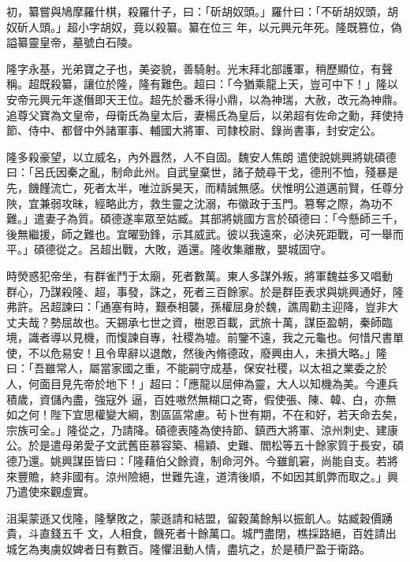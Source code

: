 \begin{pinyinscope}
 初，纂嘗與鳩摩羅什棋，殺羅什子，曰：「斫胡奴頭。」羅什曰：「不斫胡奴頭，胡奴斫人頭。」超小字胡奴，竟以殺纂。纂在位三
 年，以元興元年死。隆既篡位，偽謚纂靈皇帝，墓號白石陵。



 隆字永基，光弟寶之子也，美姿貌，善騎射。光末拜北部護軍，稍歷顯位，有聲稱。超既殺纂，讓位於隆，隆有難色。超曰：「今猶乘龍上天，豈可中下！」隆以安帝元興元年遂僭即天王位。超先於番禾得小鼎，以為神瑞，大赦，改元為神鼎。追尊父寶為文皇帝，母衛氏為皇太后，妻楊氏為皇后，以弟超有佐命之勳，拜使持節、侍中、都督中外諸軍事、輔國大將軍、司隸校尉、錄尚書事，封安定公。



 隆多殺豪望，以立威名，內外囂然，人不自固。魏安人焦朗
 遣使說姚興將姚碩德曰：「呂氏因秦之亂，制命此州。自武皇棄世，諸子兢尋干戈，德刑不恤，殘暴是先，饑饉流亡，死者太半，唯泣訴昊天，而精誠無感。伏惟明公道邁前賢，任尊分陜，宜兼弱攻昧，經略此方，救生靈之沈溺，布徽政于玉門。篡奪之際，為功不難。」遣妻子為質。碩德遂率眾至姑臧。其部將姚國方言於碩德曰：「今懸師三千，後無繼援，師之難也。宜曜勁鋒，示其威武。彼以我遠來，必決死距戰，可一舉而平。」碩德從之。呂超出戰，大敗，遁還。隆收集離散，嬰城固守。



 時熒惑犯帝坐，有群雀鬥于太廟，死者數萬。東人多謀外叛，將軍魏益多又唱動
 群心，乃謀殺隆、超，事發，誅之，死者三百餘家。於是群臣表求與姚興通好，隆弗許。呂超諫曰：「通塞有時，艱泰相襲，孫權屈身於魏，譙周勸主迎降，豈非大丈夫哉？勢屈故也。天錫承七世之資，樹恩百載，武旅十萬，謀臣盈朝，秦師臨境，識者導以見機，而愎諫自專，社稷為墟。前鑒不遠，我之元龜也。何惜尺書單使，不以危易安！且令卑辭以退敵，然後內脩德政，廢興由人，未損大略。」隆曰：「吾雖常人，屬當家國之重，不能嗣守成基，保安社稷，以太祖之業委之於人，何面目見先帝於地下！」超曰：「應龍以屈伸為靈，大人以知機為美。今連兵積歲，資儲內盡，強寇外
 逼，百姓嗷然無糊口之寄，假使張、陳、韓、白，亦無如之何！陛下宜思權變大綱，割區區常慮。茍卜世有期，不在和好，若天命去矣，宗族可全。」隆從之，乃請降。碩德表隆為使持節、鎮西大將軍、涼州刺史、建康公。於是遣母弟愛子文武舊臣慕容築、楊穎、史難、閻松等五十餘家質于長安，碩德乃還。姚興謀臣皆曰：「隆藉伯父餘資，制命河外。今雖飢窘，尚能自支。若將來豐贍，終非國有。涼州險絕，世難先違，道清後順，不如因其飢弊而取之。」興乃遣使來觀虛實。



 沮渠蒙遜又伐隆，隆擊敗之，蒙遜請和結盟，留穀萬餘斛以振飢人。姑臧穀價踴貴，斗直錢五千
 文，人相食，饑死者十餘萬口。城門盡閉，樵採路絕，百姓請出城乞為夷虜奴婢者日有數百。隆懼沮動人情，盡坑之，於是積尸盈于衛路。




\end{pinyinscope}
